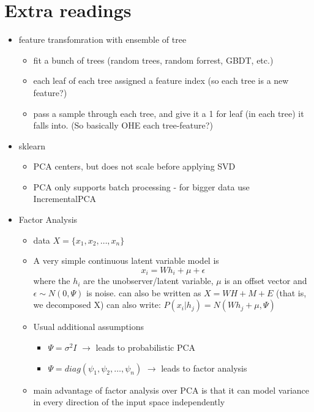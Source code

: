 \documentclass[a4paper]{report}
\begin{document}
\section{Extra readings}
\begin{itemize}
  \item feature transfomration with ensemble of tree
    \begin{itemize}
      \item fit a bunch of trees (random trees, random forrest, GBDT, etc.)
      \item each leaf of each tree assigned a feature index {\color{red} (so each tree is a new feature?)}
      \item pass a sample through each tree, and give it a 1 for leaf (in each tree) it falls into. {\color{red} (So basically OHE each tree-feature?)}
    \end{itemize}
  \item sklearn
    \begin{itemize}
      \item PCA centers, but does not scale before applying SVD
      \item PCA only supports batch processing - for bigger data use IncrementalPCA
    \end{itemize}
  \item Factor Analysis
    \begin{itemize}
      \item data  $X = \{x_1, x_2,\dots, x_n\}$
      \item A very simple continuous latent variable model is
	$$ x_i = Wh_i + \mu + \epsilon $$
	where the $h_i$ are the unobserver/latent variable, $\mu$ is an offset vector and $\epsilon \sim N(0,\Psi)$ is noise.
	\subitem can also be written as $X  = WH + M + E$ (that is, we decomposed X)
	\subitem can also write: $P(x_i | h_j) = N(Wh_j + \mu, \Psi)$
      \item Usual additional assumptions
	\begin{itemize}
	  \item $\Psi = \sigma^2 I$ $\rightarrow$ leads to probabilistic PCA
	  \item $\Psi = diag(\psi_1, \psi_2, \dots, \psi_n)$ $\rightarrow$ leads to factor analysis
	\end{itemize}
      \item main advantage of factor analysis over PCA is that it can model variance in every direction of the input space independently
    \end{itemize}
\end{itemize}
\end{document}
